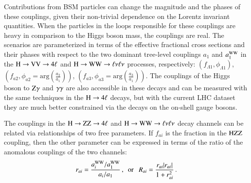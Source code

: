 Contributions from BSM particles can change the magnitude and the
phases of these couplings, given their non-trivial dependence on the
Lorentz invariant quantities. When the particles in the loops
responsible for these couplings are heavy in comparison to the Higgs
boson mass, the couplings are real.  The scenarios are parameterized
in terms of the effective fractional cross sections and their phases
with respect to the two dominant tree-level couplings $a_1$ and
$a_1^{\mathrm{W}\mathrm{W}}$ in the $\mathrm{H}\to \mathrm{V}\mathrm{V}\to 4\ell$ and $\mathrm{H}\to \mathrm{W}\mathrm{W}\to
\ell\nu\ell\nu$ processes, respectively:
$(f_{\Lambda1},\phi_{\Lambda1})$, $(f_{a2}, \phi_{a2} =
\mathrm{arg}\left(\frac{a_{2}}{a_{1}}\right))$, $(f_{a3},\phi_{a3} =
\mathrm{arg}\left(\frac{a_{3}}{a_{1}}\right))$.
The couplings of the Higgs boson to $\mathrm{Z}\gamma$ and $\gamma\gamma$ are also
accessible in these decays and can be measured with the same techniques in
the $\mathrm{H}\to4\ell$ decays, but with the current LHC dataset they are much better 
constrained via the decays on the on-shell gauge bosons.

The couplings in the $\mathrm{H}\to\mathrm{Z}\mathrm{Z}\to4\ell$ and $\mathrm{H}\to\mathrm{W}\mathrm{W}\to\ell\nu\ell\nu$ decay channels can be related via 
relationships of two free parameters. If $f_{ai}$ is the fraction in the $\mathrm{H}\mathrm{Z}\mathrm{Z}$ coupling, then
the other parameter can be expressed in terms of the ratio of the anomalous couplings of the two channels:
%
\begin{eqnarray}
r_{ai} = \frac{a_i^{\mathrm{W}\mathrm{W}} / a_1^{\mathrm{W}\mathrm{W}}  }{  a_i / a_1}\,, ~~{\rm or}~~~ R_{ai} = \frac{ r_{ai} |r_{ai}| }{  1 + r_{ai}^2 }  \, .
\label{eq:ratio_ww_zz}
\end{eqnarray} 
%


